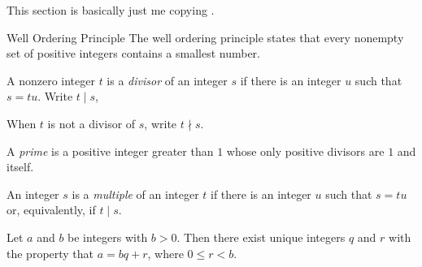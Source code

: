 \documentclass[../butidigress.tex]{subfiles}
\begin{document}
\newcommand{\vprime}[1]{{#1}^{\prime}}
\def\vp{\vprime}
\newcommand{\Z}{\mathbb{Z}}
\newcommand{\mathlist}{\itemsep2pt \parsep0pt \parskip0pt}

This section is basically just me copying .



\begin{definition}{Well Ordering Principle}
The well ordering principle states that every nonempty set of positive integers contains a smallest number.
\end{definition}

A nonzero integer $t$ is a \emph{divisor} of an integer $s$ if there is an integer $u$ such that $s=tu$.
Write $t\mid s$, 

When $t$ is not a divisor of $s$, write $t\nmid s$.

A \emph{prime} is a positive integer greater than $1$ whose only positive divisors are $1$ and itself.

An integer $s$ is a \emph{multiple} of an integer $t$ if there is an integer $u$ such that $s=tu$ or, equivalently, if $t\mid s$.

\begin{theorem}
Let $a$ and $b$ be integers with $b>0$.
Then there exist unique integers $q$ and $r$ with the property that $a=bq+r$, where $0\leq r<b$.
\end{theorem}
\end{document}
